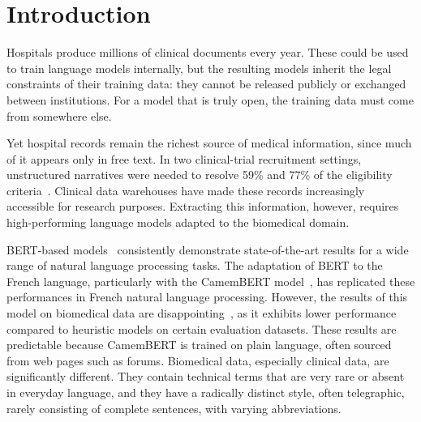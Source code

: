 %

\section{Introduction}

\begin{reviewread}
Hospitals produce millions of clinical documents every year. These could be used to train language models internally, but the resulting models inherit the legal constraints of their training data: they cannot be released publicly or exchanged between institutions. For a model that is truly open, the training data must come from somewhere else.
\end{reviewread}

\begin{reviewread}
Yet hospital records remain the richest source of medical information, since much of it appears only in free text. In two clinical-trial recruitment settings, unstructured narratives were needed to resolve 59\% and 77\% of the eligibility criteria~\citep{raghavan_how_2014}. Clinical data warehouses have made these records increasingly accessible for research purposes. Extracting this information, however, requires high-performing language models adapted to the biomedical domain.
\end{reviewread}

\begin{reviewread}
BERT-based models~\citep{devlin_bert_2019} consistently demonstrate state-of-the-art results for a wide range of natural language processing tasks. The adaptation of BERT to the French language, particularly with the CamemBERT model~\citep{martin-etal-2020-camembert}, has replicated these performances in French natural language processing. However, the results of this model on biomedical data are disappointing~\citep{cardon_presentation_2020}, as it exhibits lower performance compared to heuristic models on certain evaluation datasets. These results are predictable because CamemBERT is trained on plain language, often sourced from web pages such as forums. Biomedical data, especially clinical data, are significantly different. They contain technical terms that are very rare or absent in everyday language, and they have a radically distinct style, often telegraphic, rarely consisting of complete sentences, with varying abbreviations.
\end{reviewread}


